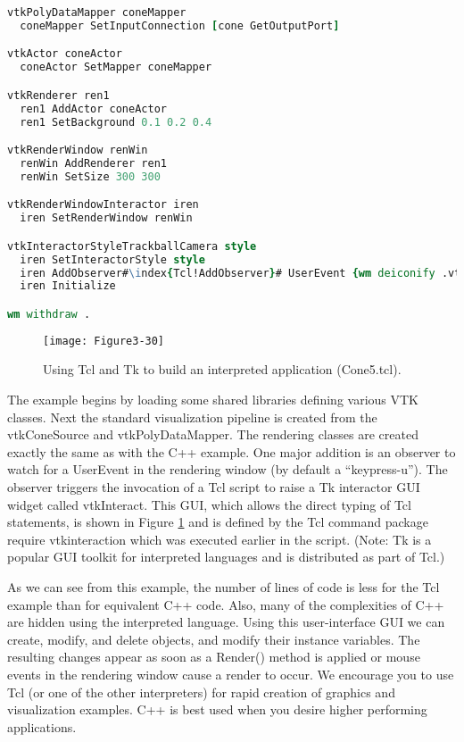 \begin{description}[leftmargin=0cm,labelindent=0cm]
\begin{lstlisting}[language=TCL, caption={Cone5.tcl}, escapechar=\% ]
vtkPolyDataMapper coneMapper
  coneMapper SetInputConnection [cone GetOutputPort]

vtkActor coneActor
  coneActor SetMapper coneMapper

vtkRenderer ren1
  ren1 AddActor coneActor
  ren1 SetBackground 0.1 0.2 0.4

vtkRenderWindow renWin
  renWin AddRenderer ren1
  renWin SetSize 300 300

vtkRenderWindowInteractor iren
  iren SetRenderWindow renWin

vtkInteractorStyleTrackballCamera style
  iren SetInteractorStyle style
  iren AddObserver#\index{Tcl!AddObserver}# UserEvent {wm deiconify .vtkInteract}
  iren Initialize

wm withdraw .
\end{lstlisting}

\begin{figure}[!htb]
  \centering
  \texttt{[image: Figure3-30]}\\
  \caption{Using Tcl and Tk to build an interpreted application (Cone5.tcl).}\label{fig:Figure3-30}
\end{figure}

The example begins by loading some shared libraries defining various VTK classes. Next the standard visualization pipeline is created from the vtkConeSource and vtkPolyDataMapper. The rendering classes are created exactly the same as with the C++ example. One major addition is an observer to watch for a UserEvent in the rendering window (by default a ``keypress-u''). The observer triggers the invocation of a Tcl script to raise a Tk interactor GUI widget called vtkInteract. This GUI, which allows the direct typing of Tcl statements, is shown in Figure \ref{fig:Figure3-30} and is defined by the Tcl command package require vtkinteraction which was executed earlier in the script. (Note: Tk is a popular GUI toolkit for interpreted languages and is distributed as part of Tcl.) 

As we can see from this example, the number of lines of code is less for the Tcl example than for equivalent C++ code. Also, many of the complexities of C++ are hidden using the interpreted language. Using this user-interface GUI we can create, modify, and delete objects, and modify their instance variables. The resulting changes appear as soon as a Render() method is applied or mouse events in the rendering window cause a render to occur. We encourage you to use Tcl (or one of the other interpreters) for rapid creation of graphics and visualization examples. C++ is best used when you desire higher performing applications.

\end{description}

